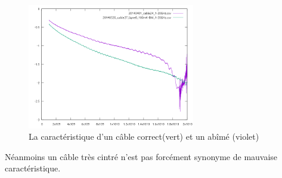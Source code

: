 \begin{figure}[ht]
    \begin{center}
        \includegraphics[width=0.65\textwidth]{Images/Caracs/abime2.png}
        \caption{La caractéristique d'un câble correct(vert) et un abîmé (violet)}
        \label{Carac1}
    \end{center}
\end{figure}

Néanmoins un câble très cintré n'est pas forcément synonyme de mauvaise caractéristique.


